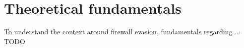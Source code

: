 \section{Theoretical fundamentals}
To understand the context around firewall evasion, fundamentals regarding ... {\color{red} TODO}
